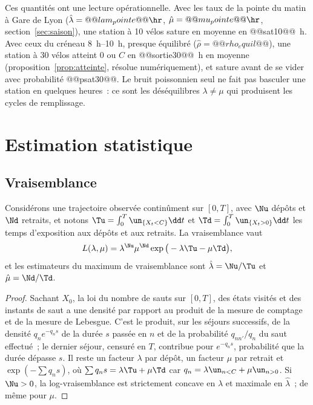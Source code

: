 Ces quantités ont une lecture opérationnelle. Avec les taux de la pointe du matin à Gare de Lyon ($\hat\lambda=@@lam_pointe@@\hr$, $\hat\mu=@@mu_pointe@@\hr$, section~\ref{sec:saison}), une station à 10 vélos sature en moyenne en @@sat10@@~h. Avec ceux du créneau 8~h--10~h, presque équilibré ($\hat\rho=@@rho_equil@@$), une station à 30 vélos atteint $0$ ou $C$ en @@sortie30@@~h en moyenne (proposition~\ref{prop:atteinte}, résolue numériquement), et sature avant de se vider avec probabilité @@psat30@@. Le bruit poissonnien seul ne fait pas basculer une station en quelques heures~: ce sont les déséquilibres $\lambda\neq\mu$ qui produisent les cycles de remplissage.

\section{Estimation statistique}\label{sec:estimation}

\subsection{Vraisemblance}

\begin{proposition}\label{prop:emv}
Considérons une trajectoire observée continûment sur $[0,T]$, avec $\Nu$ dépôts et $\Nd$ retraits, et notons $\Tu=\int_0^T\un_{\{X_t<C\}}\dd t$ et $\Td=\int_0^T\un_{\{X_t>0\}}\dd t$ les temps d'exposition aux dépôts et aux retraits. La vraisemblance vaut
\[
L(\lambda,\mu)=\lambda^{\Nu}\mu^{\Nd}\exp\big(-\lambda\Tu-\mu\Td\big),
\]
et les estimateurs du maximum de vraisemblance sont $\hat\lambda=\Nu/\Tu$ et $\hat\mu=\Nd/\Td$.
\end{proposition}

\begin{proof}
Sachant $X_0$, la loi du nombre de sauts sur $[0,T]$, des états visités et des instants de saut a une densité par rapport au produit de la mesure de comptage et de la mesure de Lebesgue. C'est le produit, sur les séjours successifs, de la densité $q_ne^{-q_ns}$ de la durée $s$ passée en $n$ et de la probabilité $q_{nn'}/q_n$ du saut effectué~; le dernier séjour, censuré en $T$, contribue pour $e^{-q_ns}$, probabilité que la durée dépasse $s$. Il reste un facteur $\lambda$ par dépôt, un facteur $\mu$ par retrait et $\exp(-\sum q_ns)$, où $\sum q_ns=\lambda\Tu+\mu\Td$ car $q_n=\lambda\un_{n<C}+\mu\un_{n>0}$. Si $\Nu>0$, la log-vraisemblance est strictement concave en $\lambda$ et maximale en $\hat\lambda$~; de même pour $\mu$.
\end{proof}

